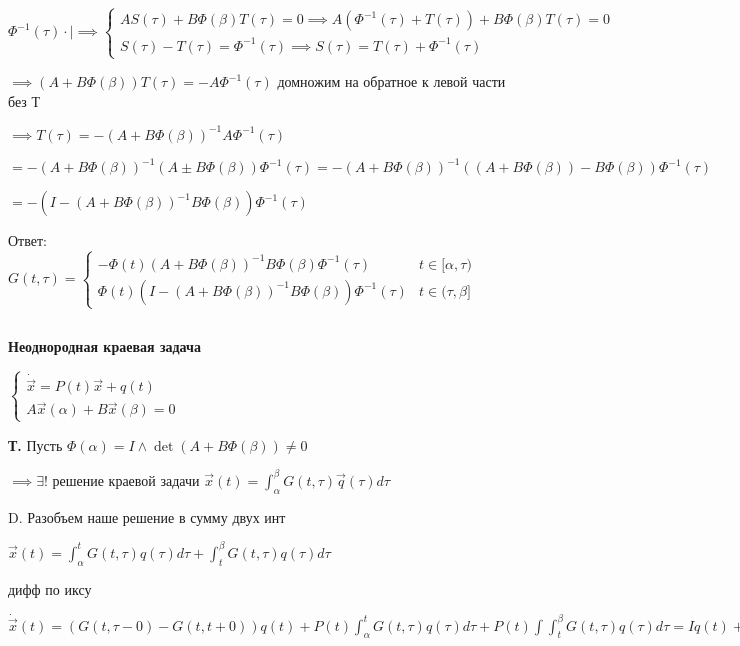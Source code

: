 \documentclass[12pt, a4paper]{article}
\begin{document}
    $\Phi^{-1}(\tau) \cdot \mid \implies
    \begin{cases}
        AS(\tau) + B\Phi(\beta)T(\tau) = 0 \implies A(\Phi^{-1}(\tau) + T(\tau)) + B\Phi(\beta)T(\tau) = 0\\
        S(\tau) - T(\tau) = \Phi^{-1}(\tau) \implies S(\tau) = T(\tau) + \Phi^{-1}(\tau)
    \end{cases}$

    $\implies (A+ B\Phi(\beta))T(\tau) = -A\Phi^{-1}(\tau)$ домножим на обратное к левой части без Т
    
    $\implies T(\tau) = -(A + B\Phi(\beta))^{-1}A\Phi^{-1}(\tau)$

    $= -(A + B\Phi(\beta))^{-1}(A \pm B\Phi(\beta))\Phi^{-1}(\tau) = 
    -(A + B\Phi(\beta))^{-1}((A + B\Phi(\beta)) - B\Phi(\beta))\Phi^{-1}(\tau)$

    $= -(I - (A + B\Phi(\beta))^{-1}B\Phi(\beta))\Phi^{-1}(\tau)$

    Ответ: $G(t, \tau) = \begin{cases}
        -\Phi(t)(A + B\Phi(\beta))^{-1}B\Phi(\beta)\Phi^{-1}(\tau) & t \in [\alpha, \tau)\\
        \Phi(t)(I - (A + B\Phi(\beta))^{-1}B\Phi(\beta))\Phi^{-1}(\tau) & t \in (\tau, \beta]
    \end{cases}$

    \par $ $

    {\large\textbf{Неоднородная краевая задача}}

    $\begin{cases}
        \dot{\vec{x}} = P(t)\vec{x} + q(t)\\
        A\vec{x}(\alpha) + B\vec{x}(\beta) = 0
    \end{cases}$

    \textbf{Т.} Пусть $\Phi(\alpha) = I \land \det(A + B\Phi(\beta))\neq 0$

    $\implies \exists ! $ решение краевой задачи $\vec{x}(t) = \int^\beta_\alpha G(t, \tau)\vec{q}(\tau)d\tau$

    D. Разобъем наше решение в сумму двух инт

    $\vec{x}(t) = \int^t_\alpha G(t, \tau)q(\tau)d\tau + \int^\beta_t G(t, \tau)q(\tau)d\tau$

    дифф по иксу

    $\dot{\vec{x}}(t) = (G(t, \tau - 0) - G(t, t+0))q(t) + P(t)\int_\alpha^t G(t, \tau)q(\tau)d\tau + P(t)\int\int_t^\beta G(t, \tau)q(\tau)d\tau= 
    Iq(t)  + P(T)\int^\beta_\alpha G(t, \tau)q(\tau) d\tau = P(t)\vec{x} + q(t)$
\end{document}
